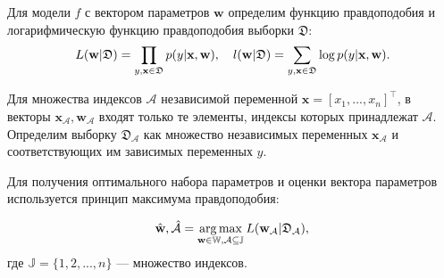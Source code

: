 \documentclass[12pt,twoside]{article}
\begin{document}
Для модели $f$ с вектором параметров $\textbf{w}$ определим функцию правдоподобия и логарифмическую функцию правдоподобия выборки $\mathfrak D$:
\begin{equation}\label{L_l}
L(\textbf{w} | \mathfrak D) = \prod_{y, \textbf{x} \in \mathfrak D} p(y | \textbf{x}, \textbf{w}),~~~ l(\textbf w | \mathfrak D) = \sum_{y, \textbf{x} \in \mathfrak D}\log p(y | \textbf{x}, \textbf{w}).
\end{equation}







Для множества индексов $\mathcal{A}$ независимой переменной $\mathbf{x} = [x_1, ..., x_n]^{\top}$, в векторы $\mathbf{x}_{\mathcal{A}}, \mathbf{w}_{\mathcal{A}}$ входят только те элементы, индексы которых принадлежат $\mathcal{A}$. Определим выборку $\mathfrak{D}_{\mathcal{A}}$ как множество независимых переменных $\mathbf{x}_{\mathcal{A}}$ и соответствующих им зависимых переменных $y$.


Для получения оптимального набора параметров и оценки вектора параметров используется принцип максимума правдоподобия:

\begin{equation}\label{argmax_L}
\hat{\textbf{w}}, \hat{\mathcal{A}} = \argmax_{\mathbf{w} \in \mathbb{W}, \mathcal{A} \subseteq \mathbb{J}} L(\textbf{w}_{\mathcal{A}} | \mathfrak D_{\mathcal{A}}),
\end{equation}
где $\mathbb{J} = \{1, 2, ..., n\}$ --- множество индексов.
\end{document}
